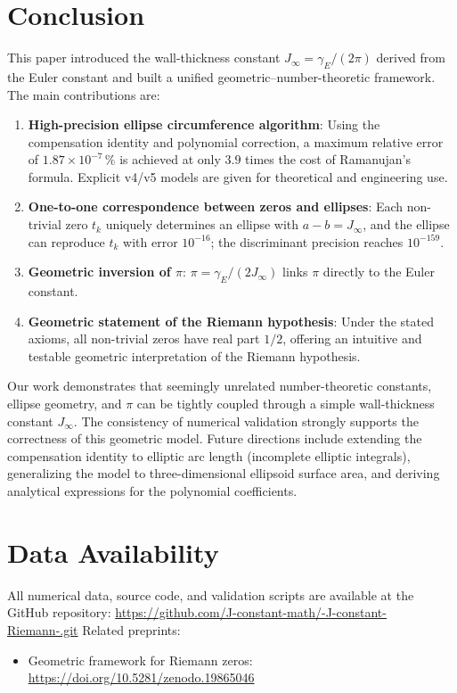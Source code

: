 \documentclass[12pt,a4paper]{article}
\begin{document}
\section{Conclusion}\label{sec:conclusion}
This paper introduced the wall-thickness constant $J_\infty = \gamma_E/(2\pi)$ derived from the Euler constant and built a unified geometric--number-theoretic framework. The main contributions are:
\begin{enumerate}
\item \textbf{High-precision ellipse circumference algorithm}: Using the compensation identity and polynomial correction, a maximum relative error of $1.87\times10^{-7}\,\%$ is achieved at only $3.9$ times the cost of Ramanujan's formula. Explicit v4/v5 models are given for theoretical and engineering use.
\item \textbf{One-to-one correspondence between zeros and ellipses}: Each non-trivial zero $t_k$ uniquely determines an ellipse with $a-b=J_\infty$, and the ellipse can reproduce $t_k$ with error $10^{-16}$; the discriminant precision reaches $10^{-159}$.
\item \textbf{Geometric inversion of $\pi$}: $\pi = \gamma_E/(2J_\infty)$ links $\pi$ directly to the Euler constant.
\item \textbf{Geometric statement of the Riemann hypothesis}: Under the stated axioms, all non-trivial zeros have real part $1/2$, offering an intuitive and testable geometric interpretation of the Riemann hypothesis.
\end{enumerate}

Our work demonstrates that seemingly unrelated number-theoretic constants, ellipse geometry, and $\pi$ can be tightly coupled through a simple wall-thickness constant $J_\infty$. The consistency of numerical validation strongly supports the correctness of this geometric model. Future directions include extending the compensation identity to elliptic arc length (incomplete elliptic integrals), generalizing the model to three-dimensional ellipsoid surface area, and deriving analytical expressions for the polynomial coefficients.

\section*{Data Availability}
All numerical data, source code, and validation scripts are available at the GitHub repository:
\url{https://github.com/J-constant-math/-J-constant-Riemann-.git}
Related preprints:
\begin{itemize}
\item Geometric framework for Riemann zeros: \url{https://doi.org/10.5281/zenodo.19865046}
\end{itemize}
\end{document}
